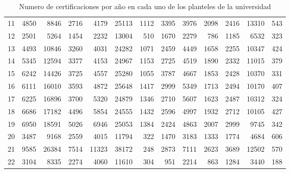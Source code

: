 \documentclass[12pt]{article}
\begin{document}
\begin{table}[ht]
{\begin{tabular}{||c||rrrrrr||rrrrrr||}
  11 & 4850 & 8846 & 2716 & 4179& 25113 &  1112& 3395 & 3976 & 2098 & 2416 &13310  &  543\\
  12 & 2501 & 5264 & 1454 & 2232& 13004  &  510& 1670 & 2279 &  786 & 1185 & 6532  &  323\\
  13 & 4493 &10846 & 3260 & 4031& 24282  & 1071& 2459 & 4449 & 1658 & 2255 &10347  &  424\\
  14 & 5345 &12594 & 3377 & 4153& 24967  & 1153& 2725 & 4519 & 1890 & 2332 &11015  &  379\\
  15 & 6242 &14426 & 3725 & 4557& 25280  & 1055& 3787 & 4667 & 1853 & 2428 &10370  &  331\\
  16 & 6111 &16010 & 3593 & 4872& 25648  & 1417& 2999 & 5349 & 1713 & 2494 &10170  &  407\\
  17 & 6225 &16896 & 3700 & 5320& 24879  & 1346& 2710 & 5607 & 1623 & 2487 &10312  &  324\\
  18 & 6686 &17182 & 4496 & 5854& 24555  & 1432& 2596 & 4997 & 1932 & 2712 &10105  &  427\\
  19 & 6950 &18591 & 5026 & 6946& 25053  & 1384& 2424 & 4863 & 2007 & 2999 & 9745  &  342\\
  20 & 3487 & 9168 & 2559 & 4015& 11794  &  322& 1470 & 3183 & 1333 & 1774 & 4684  &  606\\
  21 & 9585 &26384 & 7514 &11323& 38172  &  248& 2873 & 7111 & 2623 & 3689 &12502  &  570\\
  22 & 3104 & 8335 & 2274 & 4060& 11610  &  304&  951 & 2214 &  863 & 1284 & 3440  &  188\\\hline\hline
\end{tabular}}
\caption{Numero de certificaciones por a\~no en cada uno de los planteles de la universidad}
\label{Tabla_Certificaciones_Plantel_Anho}
\end{table}
\end{document}
